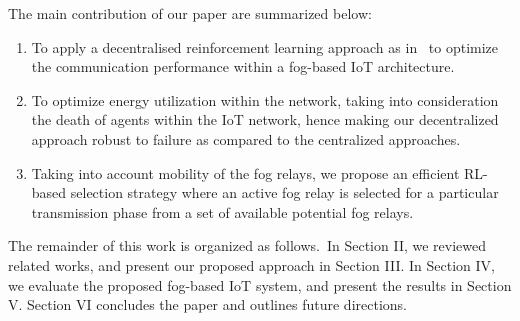 \documentclass[journal]{IEEEtran}
\begin{document}
The main contribution of our paper are summarized below:
\begin{enumerate}
  \item To apply a decentralised reinforcement learning approach as in~\cite{Gueriau2018} to optimize the communication performance within a fog-based IoT architecture.
  \item To optimize energy utilization within the network, taking into consideration the death of agents within the IoT network, hence making our decentralized approach robust to failure as compared to the centralized approaches.
  \item Taking into account mobility of the fog relays, we propose an efficient RL-based selection strategy where an active fog relay is selected for a particular transmission phase from a set of available potential fog relays.
\end{enumerate}

The remainder of this work is organized as follows.~In Section II, we reviewed related works, and present our proposed approach in Section III. In Section IV, we evaluate the proposed fog-based IoT system, and present the results in Section V. Section VI concludes the paper and outlines future directions.
\end{document}
